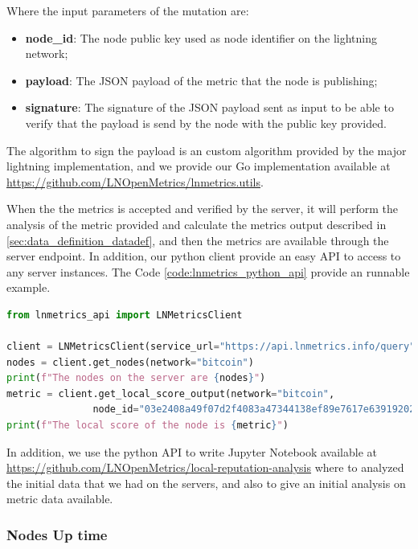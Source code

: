 Where the input parameters of the mutation are:

\begin{itemize}
    \item {\bf node\_id}: The node public key used as node identifier on the lightning network;
    \item {\bf payload}: The JSON payload of the metric that the node is publishing;
    \item {\bf signature}: The signature of the JSON payload sent as input to be able to verify that the 
        payload is send by the node with the public key provided.
\end{itemize}

The algorithm to sign the payload is an custom algorithm provided by the major
lightning implementation, and we provide our Go implementation available 
at \url{https://github.com/LNOpenMetrics/lnmetrics.utils}.

When the the metrics is accepted and verified by the server, it will perform the analysis of the 
metric provided and calculate the metrics output described in \ref{sec:data_definition_datadef}, 
and then the metrics are available through the server endpoint. In addition, our python client 
provide an easy API to access to any server instances. The Code \ref{code:lnmetrics_python_api}
provide an runnable example.


\begin{lstlisting}[language=python, basicstyle=\small,
                  caption={Python script to show a runnable example of our pythion wrapper API usage.}, 
                  label={code:lnmetrics_python_api}]
from lnmetrics_api import LNMetricsClient

client = LNMetricsClient(service_url="https://api.lnmetrics.info/query")
nodes = client.get_nodes(network="bitcoin")
print(f"The nodes on the server are {nodes}")
metric = client.get_local_score_output(network="bitcoin", 
               node_id="03e2408a49f07d2f4083a47344138ef89e7617e63919202c92aa8d49b574a560ae")
print(f"The local score of the node is {metric}")
\end{lstlisting}

In addition, we use the python API to write Jupyter Notebook available at \url{https://github.com/LNOpenMetrics/local-reputation-analysis}
where to analyzed the initial data that we had on the servers, and also to give 
an initial analysis on metric data available.

\subsubsection{Nodes Up time}

